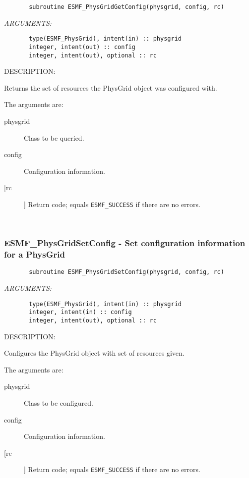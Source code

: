  
\begin{verbatim}       subroutine ESMF_PhysGridGetConfig(physgrid, config, rc)\end{verbatim}{\em ARGUMENTS:}
\begin{verbatim}       type(ESMF_PhysGrid), intent(in) :: physgrid
       integer, intent(out) :: config   
       integer, intent(out), optional :: rc              \end{verbatim}
{\sf DESCRIPTION:\\ }


       Returns the set of resources the PhysGrid object was configured with.
  
       The arguments are:
       \begin{description}
       \item[physgrid] 
            Class to be queried.
       \item[config]
            Configuration information.         
       \item[[rc]] 
            Return code; equals {\tt ESMF\_SUCCESS} if there are no errors.
       \end{description}
   
 
\mbox{}\hrulefill\ 
 
\subsubsection{ESMF\_PhysGridSetConfig - Set configuration information for a PhysGrid}


 
\begin{verbatim}       subroutine ESMF_PhysGridSetConfig(physgrid, config, rc)\end{verbatim}{\em ARGUMENTS:}
\begin{verbatim}       type(ESMF_PhysGrid), intent(in) :: physgrid
       integer, intent(in) :: config   
       integer, intent(out), optional :: rc             
 \end{verbatim}
{\sf DESCRIPTION:\\ }


       Configures the PhysGrid object with set of resources given.
  
       The arguments are:
       \begin{description}
       \item[physgrid] 
            Class to be configured.
       \item[config]
            Configuration information.         
       \item[[rc]] 
            Return code; equals {\tt ESMF\_SUCCESS} if there are no errors.
       \end{description}
   
